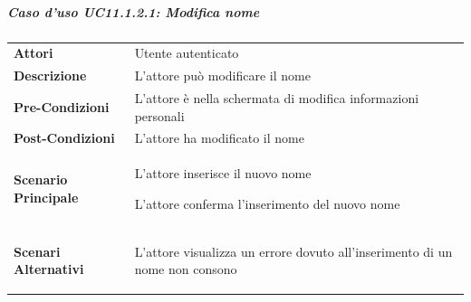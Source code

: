 \subparagraph{Caso d'uso UC11.1.2.1: Modifica nome}
\label{UC11_1_2_1}
\begin{minipage}{\linewidth}
	\begin{tabular}{ l | p{11cm}}
		\hline
		\rowcolor{Gray}
		\multicolumn{2}{c}{UC11.1.2.1 - Modifica nome} \\
		\hline
		\textbf{Attori} & Utente autenticato \\
		\textbf{Descrizione} & L'attore può modificare il nome\\
		\textbf{Pre-Condizioni} & L'attore è nella schermata di modifica informazioni personali\\
		\textbf{Post-Condizioni} & L'attore ha modificato il nome \\
		\textbf{Scenario Principale} & 
		\begin{enumerate*}[label=(\arabic*.),itemjoin={\newline}]
			\item L'attore inserisce il nuovo nome
			\item L'attore conferma l'inserimento del nuovo nome
		\end{enumerate*}\\
		\textbf{Scenari Alternativi} & 
		\begin{enumerate*}[label=(\arabic*.),itemjoin={\newline}]
			\item L'attore visualizza un errore dovuto all'inserimento di un nome non consono
		\end{enumerate*}
	\end{tabular}
\end{minipage}

